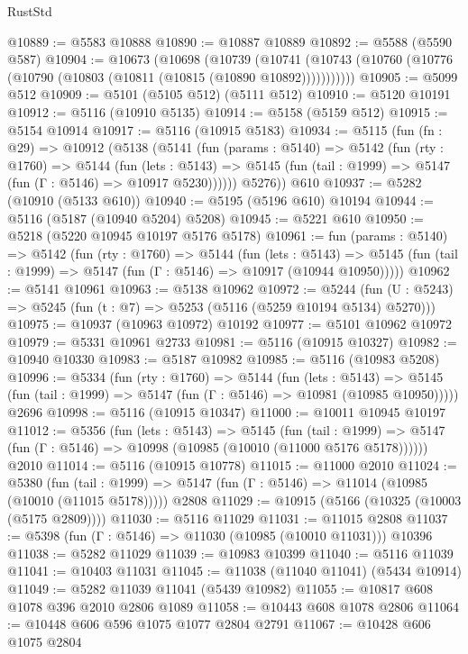 \begin{lexlean}{RustStd}
\begin{coremodule}
{\begin{coremodule}
{{{{{{{{{{{{{{{{{{{{{{{{{{{{{{{@10889 := @5583 @10888
@10890 := @10887 @10889
@10892 := @5588 (@5590 @587)
@10904 := @10673
    (@10698
      (@10739
        (@10741 (@10743 (@10760 (@10776 (@10790 (@10803 (@10811 (@10815 (@10890 @10892)))))))))))
@10905 := @5099 @512
@10909 := @5101 (@5105 @512) (@5111 @512)
@10910 := @5120 @10191
@10912 := @5116 (@10910 @5135)
@10914 := @5158 (@5159 @512)
@10915 := @5154 @10914
@10917 := @5116 (@10915 @5183)
@10934 := @5115
    (fun (fn : @29) =>
    @10912
      (@5138
        (@5141
          (fun (params : @5140) =>
          @5142
            (fun (rty : @1760) =>
            @5144
              (fun (lets : @5143) =>
              @5145 (fun (tail : @1999) => @5147 (fun (Γ : @5146) => @10917 @5230))))))
        @5276))
    @610
@10937 := @5282 (@10910 (@5133 @610))
@10940 := @5195 (@5196 @610) @10194
@10944 := @5116 (@5187 (@10940 @5204) @5208)
@10945 := @5221 @610
@10950 := @5218 (@5220 @10945 @10197 @5176 @5178)
@10961 := fun (params : @5140) =>
  @5142
    (fun (rty : @1760) =>
    @5144
      (fun (lets : @5143) =>
      @5145 (fun (tail : @1999) => @5147 (fun (Γ : @5146) => @10917 (@10944 @10950)))))
@10962 := @5141 @10961
@10963 := @5138 @10962
@10972 := @5244
    (fun (U : @5243) => @5245 (fun (t : @7) => @5253 (@5116 (@5259 @10194 @5134) @5270)))
@10975 := @10937 (@10963 @10972) @10192
@10977 := @5101 @10962 @10972
@10979 := @5331 @10961 @2733
@10981 := @5116 (@10915 @10327)
@10982 := @10940 @10330
@10983 := @5187 @10982
@10985 := @5116 (@10983 @5208)
@10996 := @5334
    (fun (rty : @1760) =>
    @5144
      (fun (lets : @5143) =>
      @5145 (fun (tail : @1999) => @5147 (fun (Γ : @5146) => @10981 (@10985 @10950)))))
    @2696
@10998 := @5116 (@10915 @10347)
@11000 := @10011 @10945 @10197
@11012 := @5356
    (fun (lets : @5143) =>
    @5145
      (fun (tail : @1999) =>
      @5147 (fun (Γ : @5146) => @10998 (@10985 (@10010 (@11000 @5176 @5178))))))
    @2010
@11014 := @5116 (@10915 @10778)
@11015 := @11000 @2010
@11024 := @5380
    (fun (tail : @1999) => @5147 (fun (Γ : @5146) => @11014 (@10985 (@10010 (@11015 @5178)))))
    @2808
@11029 := @10915 (@5166 (@10325 (@10003 (@5175 @2809))))
@11030 := @5116 @11029
@11031 := @11015 @2808
@11037 := @5398 (fun (Γ : @5146) => @11030 (@10985 (@10010 @11031))) @10396
@11038 := @5282 @11029
@11039 := @10983 @10399
@11040 := @5116 @11039
@11041 := @10403 @11031
@11045 := @11038 (@11040 @11041) (@5434 @10914)
@11049 := @5282 @11039 @11041 (@5439 @10982)
@11055 := @10817 @608 @1078 @396 @2010 @2806 @1089
@11058 := @10443 @608 @1078 @2806
@11064 := @10448 @606 @596 @1075 @1077 @2804 @2791
@11067 := @10428 @606 @1075 @2804
}}}}}}}}}}}}}}}}}}}}}}}}}}}}}}}
\end{coremodule}}
\end{coremodule}
\end{lexlean}
